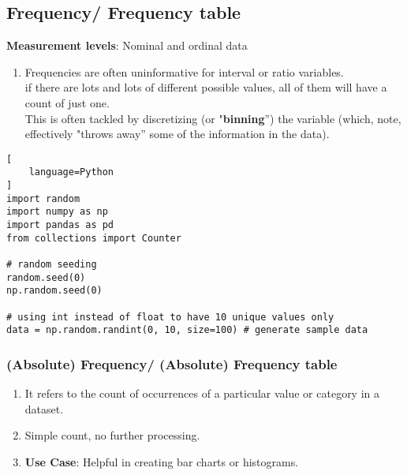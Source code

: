 \subsection{Frequency/ Frequency table \cite{statistics/book/Statistics-for-Data-Scientists/Maurits-Kaptein}}\label{Data/Describing Data/Frequency or Frequency table}

\textbf{Measurement levels}: Nominal and ordinal data \hfill \cite{statistics/book/Statistics-for-Data-Scientists/Maurits-Kaptein}

\vspace{0.3cm}

\begin{enumerate}
    \item Frequencies are often uninformative for interval or ratio variables. \hfill \cite{statistics/book/Statistics-for-Data-Scientists/Maurits-Kaptein}\\
    if there are lots and lots of different possible values, all of them will have a count of just one. \hfill \cite{statistics/book/Statistics-for-Data-Scientists/Maurits-Kaptein}\\
    This is often tackled by discretizing (or "\textbf{binning}”\label{Data/Describing Data/Frequency or Frequency table/binning}) the variable (which, note, effectively "throws away” some of the information in the data). \hfill \cite{statistics/book/Statistics-for-Data-Scientists/Maurits-Kaptein}

    
\end{enumerate}


\begin{lstlisting}[
    language=Python
]
import random
import numpy as np
import pandas as pd
from collections import Counter

# random seeding
random.seed(0)
np.random.seed(0)

# using int instead of float to have 10 unique values only
data = np.random.randint(0, 10, size=100) # generate sample data
\end{lstlisting}


\subsubsection{(Absolute) Frequency/ (Absolute) Frequency table \cite{statistics/book/Statistics-for-Data-Scientists/Maurits-Kaptein}}\label{Data/Describing Data/Frequency or Frequency table/Absolute}

\begin{enumerate}
    \item It refers to the count of occurrences of a particular value or category in a dataset. \hfill \cite{common/online/chatgpt}

    \item Simple count, no further processing. \hfill \cite{common/online/chatgpt}

    \item \textbf{Use Case}: Helpful in creating bar charts or histograms. \hfill \cite{common/online/chatgpt}
\end{enumerate}


